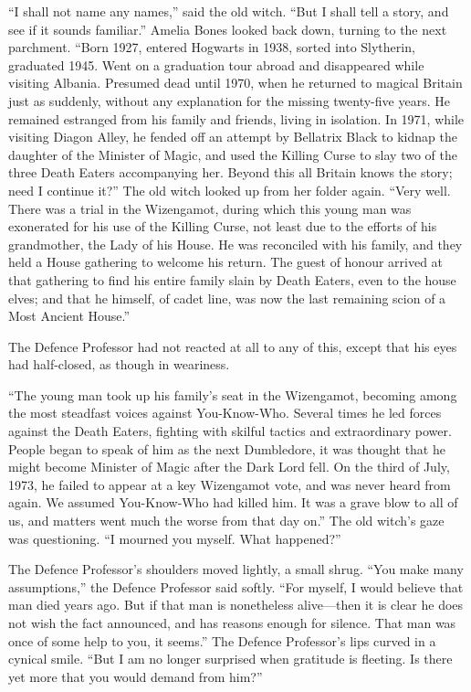 “I shall not name any names,” said the old witch. “But I shall tell a story, and see if it sounds familiar.” Amelia Bones looked back down, turning to the next parchment. “Born 1927, entered Hogwarts in 1938, sorted into Slytherin, graduated 1945. Went on a graduation tour abroad and disappeared while visiting Albania. Presumed dead until 1970, when he returned to magical Britain just as suddenly, without any explanation for the missing twenty-five years. He remained estranged from his family and friends, living in isolation. In 1971, while visiting Diagon Alley, he fended off an attempt by Bellatrix Black to kidnap the daughter of the Minister of Magic, and used the Killing Curse to slay two of the three Death Eaters accompanying her. Beyond this all Britain knows the story; need I continue it?” The old witch looked up from her folder again. “Very well. There was a trial in the Wizengamot, during which this young man was exonerated for his use of the Killing Curse, not least due to the efforts of his grandmother, the Lady of his House. He was reconciled with his family, and they held a House gathering to welcome his return. The guest of honour arrived at that gathering to find his entire family slain by Death Eaters, even to the house elves; and that he himself, of cadet line, was now the last remaining scion of a Most Ancient House.”

The Defence Professor had not reacted at all to any of this, except that his eyes had half-closed, as though in weariness.

“The young man took up his family’s seat in the Wizengamot, becoming among the most steadfast voices against You-Know-Who. Several times he led forces against the Death Eaters, fighting with skilful tactics and extraordinary power. People began to speak of him as the next Dumbledore, it was thought that he might become Minister of Magic after the Dark Lord fell. On the third of July, 1973, he failed to appear at a key Wizengamot vote, and was never heard from again. We assumed You-Know-Who had killed him. It was a grave blow to all of us, and matters went much the worse from that day on.” The old witch’s gaze was questioning. “I mourned you myself. What happened?”

The Defence Professor’s shoulders moved lightly, a small shrug. “You make many assumptions,” the Defence Professor said softly. “For myself, I would believe that man died years ago. But if that man is nonetheless alive—then it is clear he does not wish the fact announced, and has reasons enough for silence. That man was once of some help to you, it seems.” The Defence Professor’s lips curved in a cynical smile. “But I am no longer surprised when gratitude is fleeting. Is there yet more that you would demand from him?”

